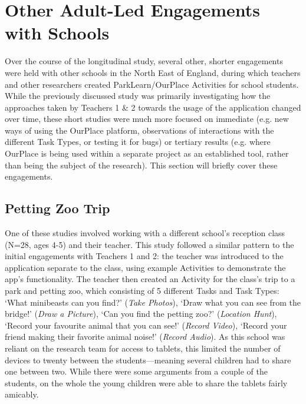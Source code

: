 \section{Other Adult-Led Engagements with Schools}
Over the course of the longitudinal study, several other, shorter engagements were held with other schools in the North East of England, during which teachers and other researchers created ParkLearn/OurPlace Activities for school students. While the previously discussed study was primarily investigating how the approaches taken by Teachers 1 \& 2 towards the usage of the application changed over time, these short studies were much more focused on immediate (e.g. new ways of using the OurPlace platform, observations of interactions with the different Task Types, or testing it for bugs) or tertiary results (e.g. where OurPlace is being used within a separate project as an established tool, rather than being the subject of the research). This section will briefly cover these engagements.

\subsection{Petting Zoo Trip}
One of these studies involved working with a different school's reception class (N=28, ages 4-5) and their teacher. This study followed a similar pattern to the initial engagements with Teachers 1 and 2: the teacher was introduced to the application separate to the class, using example Activities to demonstrate the app's functionality. The teacher then created an Activity for the class's trip to a park and petting zoo, which consisting of 5 different Tasks and Task Types: `What minibeasts can you find?' (\textit{Take Photos}), `Draw what you can see from the bridge!' (\textit{Draw a Picture}), `Can you find the petting zoo?' (\textit{Location Hunt}), `Record your favourite animal that you can see!' (\textit{Record Video}), `Record your friend making their favorite animal noise!' (\textit{Record Audio}). As this school was reliant on the research team for access to tablets, this limited the number of devices to twenty between the students---meaning several children had to share one between two. While there were some arguments from a couple of the students, on the whole the young children were able to share the tablets fairly amicably. 

